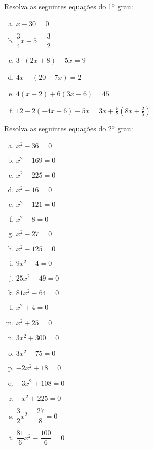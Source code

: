 \begin{exer}
Resolva as seguintes equações do 1º grau:

\begin{multicols}{2}
\begin{enumerate}[a)]
\item $x - 30=0$
\item $\dfrac{3}{4}x + 5= \dfrac{3}{2}$
\item $3 \cdot (2x + 8) - 5x= 9$
\item $4x - (20 - 7x)= 2$
\item $4(x+2) + 6(3x+6)= 45$
\item $12 - 2(-4x + 6) - 5x= 3x + \frac{5}{2}(8x + \frac{2}{5})$
\end{enumerate}
\end{multicols}
\end{exer}
\begin{resp}
  \construirResp
\end{resp}

\begin{exer}
Resolva as seguintes equações do 2º grau:

\begin{multicols}{3}
\begin{enumerate}[a)]
\item $x^2 - 36=0$
\item $x^2 - 169=0$
\item $x^2 - 225=0$
\item $x^2 - 16=0$
\item $x^2 - 121=0$
\item $x^2 - 8=0$
\item $x^2 - 27=0$
\item $x^2 - 125=0$
\item $9x^2 - 4=0$
\item $25x^2 - 49=0$
\item $81x^2 - 64=0$
\item $x^2 + 4=0$
\item $x^2 + 25=0$
\item $3x^2 + 300=0$
\item $3x^2 - 75=0$
\item $-2x^2 + 18=0$
\item $-3x^2 + 108=0$
\item $-x^2 + 225=0$
\item $\dfrac{3}{2}x^2 - \dfrac{27}{8}= 0$
\item $\dfrac{81}{6}x^2 - \dfrac{100}{6}= 0$
\end{enumerate}
\end{multicols}
\end{exer}
\begin{resp}
  \construirResp
\end{resp}

